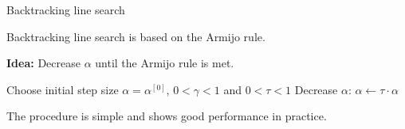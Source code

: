 	\begin{vbframe}{Backtracking line search}
		
		Backtracking line search is based on the Armijo rule.
		
		\lz
		
		\textbf{Idea: } Decrease $\alpha$ until the Armijo rule is met.
		
		\begin{algorithm}[H]
			\caption{Backtracking line search}
			\begin{algorithmic}[1]
				\State Choose initial step size $\alpha = \alpha^{[0]}$, $0 < \gamma < 1$ and $0 < \tau < 1$
				\State Decrease $\alpha$: $\alpha \leftarrow \tau \cdot \alpha$
				\EndWhile
			\end{algorithmic}
		\end{algorithm}
		
		The procedure is simple and shows good performance in practice.
		
	\end{vbframe}
	
